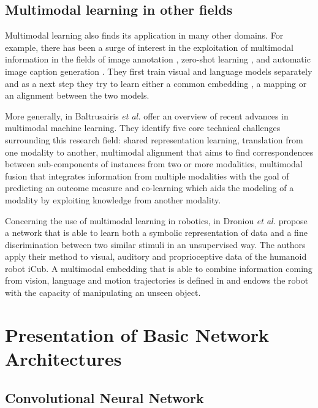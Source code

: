 \subsection{Multimodal learning in other fields}

Multimodal learning also finds its application in many other domains.
For example, there has been a surge of interest in the exploitation of
multimodal
information in the fields of image annotation \cite{J. Weston 2010},
zero-shot learning \cite{A. Frome 2013, R. Socher 2013}, and automatic
image caption generation \cite{A. Karpathy 2015}. They first train
visual and language models separately and as a next step they try
to learn either a common embedding \cite{J. Weston 2010}, a mapping
\cite{A. Frome 2013, R. Socher 2013} or an alignment \cite{A. Karpathy 2015}
between the two models.

More generally, in \cite{T. Baltrusaitis 2017} Baltrusairis \textit{et al.}
offer an overview of recent advances in multimodal machine learning.
They identify five core technical challenges surrounding this research
field: shared representation learning, translation from one modality to
another, multimodal alignment that aims to
find correspondences between sub-components of instances from two
or more modalities, multimodal fusion that integrates information
from multiple modalities with the goal of predicting an outcome measure
and co-learning which aids the modeling of a modality by exploiting
knowledge from another modality.

Concerning the use of multimodal learning in robotics, in 
\cite{A. Droniou 2014} Droniou \textit{et al.} propose a network that is
able to learn both
a symbolic representation of data and a fine discrimination between
two similar stimuli in an unsupervised way. The authors apply their method
to visual, auditory and proprioceptive data of the humanoid robot iCub.
A multimodal embedding that is able to combine information coming from
vision, language and motion trajectories is defined in \cite{J. Sung 2017}
and endows the robot with the capacity of manipulating an unseen object.

\section{Presentation of Basic Network Architectures}
\label{section:networks}

\subsection{Convolutional Neural Network} \label{subsection:CNN}

